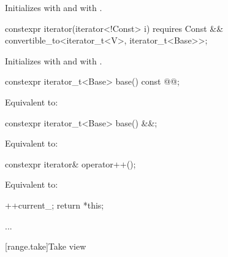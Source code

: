 \documentclass{wg21}
\begin{document}
\begin{itemdescr}
\pnum
\effects Initializes  with   and
 with .
\end{itemdescr}

%
\begin{itemdecl}
constexpr iterator(iterator<!Const> i)
requires Const && convertible_to<iterator_t<V>, iterator_t<Base>>;
\end{itemdecl}

\begin{itemdescr}
\pnum
\effects Initializes  with  and
 with .
\end{itemdescr}

\begin{itemdecl}
constexpr iterator_t<Base> base() const @@;
\end{itemdecl}

\begin{itemdescr}
	\pnum
	\effects Equivalent to: 
\end{itemdescr}


\begin{addedblock}
\begin{itemdecl}
constexpr iterator_t<Base> base() &&;
\end{itemdecl}

\begin{itemdescr}
\pnum
\effects Equivalent to: 
\end{itemdescr}
\end{addedblock}




\begin{itemdecl}
constexpr iterator& operator++();
\end{itemdecl}

\begin{itemdescr}
\pnum
\effects Equivalent to:
\begin{codeblock}
	++current_;
	return *this;
\end{codeblock}
\end{itemdescr}

...

[range.take]{Take view}
\end{document}
